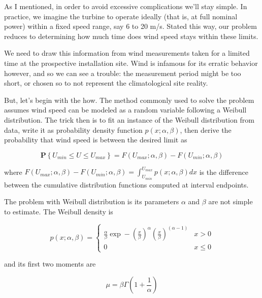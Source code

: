 \documentclass[a4paper,10pt]{book}
\begin{document}
As I mentioned, in order to avoid excessive complications we'll stay simple. In practice, we imagine the turbine to operate ideally (that is, at full nominal power) within a fixed speed range, say 6 to 20 m/s. Stated this way, our problem reduces to determining how much time does wind speed stays within these limits.

We need to draw this information from wind measurements taken for a limited time at the prospective installation site. Wind is infamous for its erratic behavior however, and so we can see a trouble: the measurement period might be too short, or chosen so to not represent the climatological site reality.

But, let's begin with the how. The method commonly used to solve the problem assumes wind speed can be modeled as a random variable following a Weibull distribution. The trick then is to fit an instance of the Weibull distribution from data, write it as probability density function $p(x;\alpha,\beta)$, then derive the probability that wind speed is between the desired limit as

\begin{equation}\label{eq:Wind probability of being between specified limits}
  \mathbf{P}\left\lbrace U_{min} \le U \le U_{max} \right\rbrace = F(U_{max};\alpha,\beta) - F(U_{min};\alpha,\beta)
\end{equation}

\noindent where $F(U_{max};\alpha,\beta) - F(U_{min};\alpha,\beta) = \int_{U_{min}}^{U_{max}} p(x;\alpha,\beta) dx$ is the difference between the cumulative distribution functions computed at interval endpoints.

The problem with Weibull distribution is its parameters $\alpha$ and $\beta$ are not simple to estimate. The Weibull density is

\begin{equation}\label{eq:Weibull Density}
	p(x;\alpha,\beta) = \left\lbrace
		\begin{array}{cr}
			\frac{\alpha}{\beta}
			\exp -(\frac{x}{\beta})^{\alpha}
			(\frac{x}{\beta})^{(\alpha - 1)} & x > 0 \\
			0 & x \le 0 
		\end{array}
	\right. 
\end{equation}

\noindent and its first two moments are

\begin{equation}\label{eq:Weibull Mean}
  \mu = \beta \Gamma \left( 1 + \frac{1}{\alpha} \right)
\end{equation}
\end{document}
